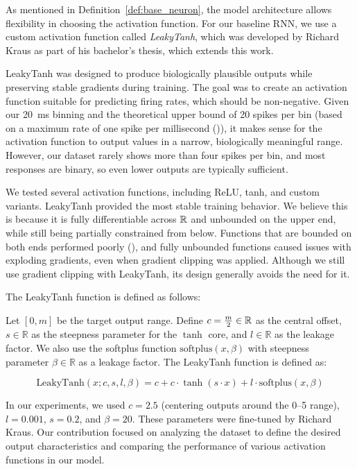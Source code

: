 As mentioned in Definition~\ref{def:base_neuron}, the model architecture allows flexibility in choosing the activation function. For our baseline RNN, we use a custom activation function called \emph{LeakyTanh}, which was developed by Richard Kraus as part of his bachelor's thesis, which extends this work.

LeakyTanh was designed to produce biologically plausible outputs while preserving stable gradients during training. The goal was to create an activation function suitable for predicting firing rates, which should be non-negative. Given our 20~ms binning and the theoretical upper bound of 20 spikes per bin (based on a maximum rate of one spike per millisecond (\citet{dayan2005theoretical})), it makes sense for the activation function to output values in a narrow, biologically meaningful range. However, our dataset rarely shows more than four spikes per bin, and most responses are binary, so even lower outputs are typically sufficient.

We tested several activation functions, including ReLU, tanh, and custom variants. LeakyTanh provided the most stable training behavior. We believe this is because it is fully differentiable across $\mathbb{R}$ and unbounded on the upper end, while still being partially constrained from below. Functions that are bounded on both ends performed poorly (\citet{shiv2022activation, nwankpa2018activationfunctionscomparisontrends}), and fully unbounded functions caused issues with exploding gradients, even when gradient clipping was applied. Although we still use gradient clipping with LeakyTanh, its design generally avoids the need for it.

The LeakyTanh function is defined as follows:

\begin{defn}[LeakyTanh]
    Let $[0, m]$ be the target output range. Define $c = \frac{m}{2} \in \mathbb{R}$ as the central offset, $s \in \mathbb{R}$ as the steepness parameter for the $\tanh$ core, and $l \in \mathbb{R}$ as the leakage factor. We also use the softplus function $\text{softplus}(x, \beta)$ with steepness parameter $\beta \in \mathbb{R}$ as a leakage factor. The LeakyTanh function is defined as:
    
    $$\text{LeakyTanh}(x; c, s, l, \beta) = c + c \cdot \tanh(s \cdot x) + l \cdot \text{softplus}(x, \beta)$$
\end{defn}
\label{def:leakytanh}

In our experiments, we used $c = 2.5$ (centering outputs around the 0--5 range), $l = 0.001$, $s = 0.2$, and $\beta = 20$. These parameters were fine-tuned by Richard Kraus. Our contribution focused on analyzing the dataset to define the desired output characteristics and comparing the performance of various activation functions in our model.

